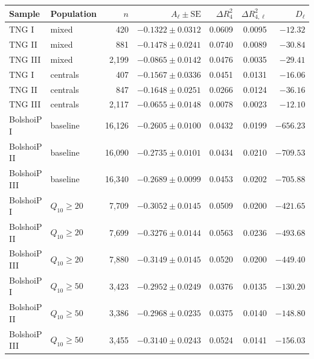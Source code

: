 \begin{tabular}{llrrrrr}\toprule
Sample & Population & $n$ & $A_{\ell}\pm\mathrm{SE}$ & $\Delta R^2_4$ & $\Delta R^2_{4,\ell}$ & $D_{\ell}$ \\ \midrule
TNG I & mixed & 420 & $-0.1322\pm0.0312$ & 0.0609 & 0.0095 & $-12.32$ \\
TNG II & mixed & 881 & $-0.1478\pm0.0241$ & 0.0740 & 0.0089 & $-30.84$ \\
TNG III & mixed & 2,199 & $-0.0865\pm0.0142$ & 0.0476 & 0.0035 & $-29.41$ \\
\addlinespace
TNG I & centrals & 407 & $-0.1567\pm0.0336$ & 0.0451 & 0.0131 & $-16.06$ \\
TNG II & centrals & 847 & $-0.1648\pm0.0251$ & 0.0266 & 0.0124 & $-36.16$ \\
TNG III & centrals & 2,117 & $-0.0655\pm0.0148$ & 0.0078 & 0.0023 & $-12.10$ \\
\addlinespace
BolshoiP I & baseline & 16,126 & $-0.2605\pm0.0100$ & 0.0432 & 0.0199 & $-656.23$ \\
BolshoiP II & baseline & 16,090 & $-0.2735\pm0.0101$ & 0.0434 & 0.0210 & $-709.53$ \\
BolshoiP III & baseline & 16,340 & $-0.2689\pm0.0099$ & 0.0453 & 0.0202 & $-705.88$ \\
\addlinespace
BolshoiP I & $Q_{10}\geq20$ & 7,709 & $-0.3052\pm0.0145$ & 0.0509 & 0.0200 & $-421.65$ \\
BolshoiP II & $Q_{10}\geq20$ & 7,699 & $-0.3276\pm0.0144$ & 0.0563 & 0.0236 & $-493.68$ \\
BolshoiP III & $Q_{10}\geq20$ & 7,880 & $-0.3149\pm0.0145$ & 0.0520 & 0.0200 & $-449.40$ \\
\addlinespace
BolshoiP I & $Q_{10}\geq50$ & 3,423 & $-0.2952\pm0.0249$ & 0.0376 & 0.0135 & $-130.20$ \\
BolshoiP II & $Q_{10}\geq50$ & 3,386 & $-0.2968\pm0.0235$ & 0.0375 & 0.0140 & $-148.80$ \\
BolshoiP III & $Q_{10}\geq50$ & 3,455 & $-0.3140\pm0.0243$ & 0.0524 & 0.0141 & $-156.03$ \\
\bottomrule\end{tabular}
